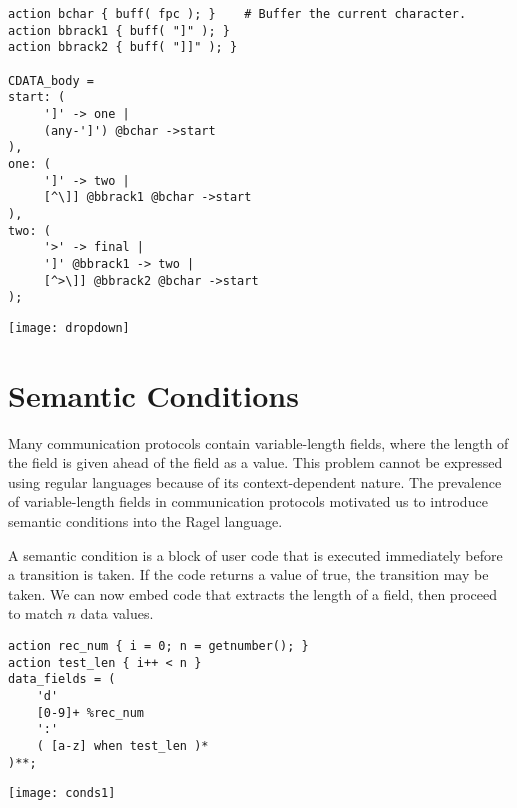 \documentclass[letterpaper,11pt,oneside]{book}
\newcommand{\graphspace}{\vspace{10pt}}
\newenvironment{inline_code}{\def\baselinestretch{1}\vspace{12pt}\small}{}
\begin{document}
\begin{inline_code}
\begin{verbatim}
action bchar { buff( fpc ); }    # Buffer the current character.
action bbrack1 { buff( "]" ); }
action bbrack2 { buff( "]]" ); }

CDATA_body =
start: (
     ']' -> one |
     (any-']') @bchar ->start
),
one: (
     ']' -> two |
     [^\]] @bbrack1 @bchar ->start
),
two: (
     '>' -> final |
     ']' @bbrack1 -> two |
     [^>\]] @bbrack2 @bchar ->start
);
\end{verbatim}
\end{inline_code}

\graphspace
\begin{center}
\texttt{[image: dropdown]}
\end{center}


\section{Semantic Conditions}
\label{semantic}

Many communication protocols contain variable-length fields, where the length
of the field is given ahead of the field as a value. This
problem cannot be expressed using regular languages because of its
context-dependent nature. The prevalence of variable-length fields in
communication protocols motivated us to introduce semantic conditions into
the Ragel language.

A semantic condition is a block of user code that is executed immediately
before a transition is taken. If the code returns a value of true, the
transition may be taken.  We can now embed code that extracts the length of a
field, then proceed to match $n$ data values.

\begin{inline_code}
\begin{verbatim}
action rec_num { i = 0; n = getnumber(); }
action test_len { i++ < n }
data_fields = (
    'd' 
    [0-9]+ %rec_num 
    ':'
    ( [a-z] when test_len )*
)**;
\end{verbatim}
\end{inline_code}

\begin{center}
\texttt{[image: conds1]}
\end{center}
\graphspace
\end{document}
